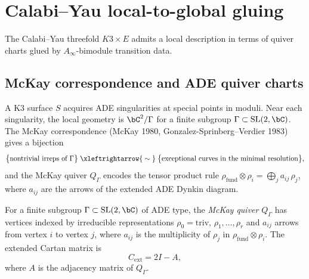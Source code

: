 
\section{Calabi--Yau local-to-global gluing}
\label{sec:cy-local-global}

The Calabi--Yau threefold $K3 \times E$ admits a local description
in terms of quiver charts glued by $A_\infty$-bimodule transition
data.

\subsection{McKay correspondence and ADE quiver charts}
\label{subsec:mckay-quiver}

A K3 surface $S$ acquires ADE singularities at special points in
moduli. Near each singularity, the local geometry is
$\bC^2/\Gamma$ for a finite subgroup $\Gamma \subset \mathrm{SL}(2,\bC)$.
The McKay correspondence (McKay 1980, Gonzalez-Sprinberg--Verdier
1983) gives a bijection
\[
\bigl\{\text{nontrivial irreps of } \Gamma\bigr\}
\;\xleftrightarrow{\;\sim\;}\;
\bigl\{\text{exceptional curves in the minimal resolution}\bigr\},
\]
and the McKay quiver $Q_\Gamma$ encodes the tensor product rule
$\rho_{\mathrm{fund}} \otimes \rho_i = \bigoplus_j a_{ij}\,\rho_j$,
where $a_{ij}$ are the arrows of the extended ADE Dynkin diagram.

\begin{definition}
\label{def:mckay-quiver}
For a finite subgroup $\Gamma \subset \mathrm{SL}(2,\bC)$ of ADE
type, the \emph{McKay quiver} $Q_\Gamma$ has vertices indexed by
irreducible representations $\rho_0 = \mathrm{triv},\,
\rho_1,\ldots,\rho_r$ and $a_{ij}$ arrows from vertex $i$ to
vertex $j$, where $a_{ij}$ is the multiplicity of $\rho_j$ in
$\rho_{\mathrm{fund}} \otimes \rho_i$. The extended Cartan matrix is
\[
C_{\mathrm{ext}} = 2I - A,
\]
where $A$ is the adjacency matrix of $Q_\Gamma$.
\end{definition}

